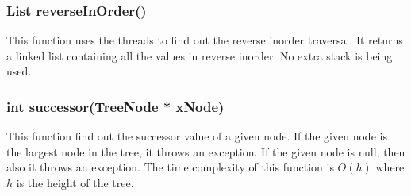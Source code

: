 \documentclass{article}
\begin{document}
\subsubsection{List reverseInOrder()}
This function uses the threads to find out the reverse inorder traversal. It returns a linked list containing all the values in reverse inorder. No extra stack is being used.

\subsubsection{int successor(TreeNode * xNode)}
This function find out the successor value of a given node. If the given node is the largest node in the tree, it throws an exception. If the given node is null, then also it throws an exception. The time complexity of this function is $O(h)$ where $h$ is the height of the tree.
\end{document}
